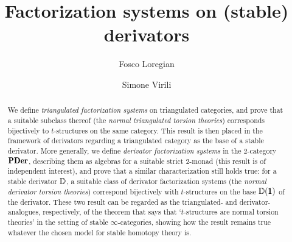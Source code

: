 \documentclass[a4paper,10pt]{amsart}
\title{Factorization systems on (stable) derivators}
\author{Fosco Loregian}
\author[Simone Virili]{Simone Virili}
\begin{document}
\maketitle
\begin{abstract}
We define \emph{triangulated factorization systems} on triangulated categories, and prove that a suitable subclass thereof (the \emph{normal triangulated torsion theories}) corresponds bijectively to $t$-structures on the same category.
This result is then placed in the framework of derivators regarding a triangulated category as the base of a stable derivator. More generally, we define \emph{derivator factorization systems} in the 2-category $\PDer$, describing them as algebras for a suitable strict 2-monad (this result is of independent interest), and prove that a similar characterization still holds true: for a stable derivator $\mathbb{D}$, a suitable class of derivator factorization systems (the \emph{normal derivator torsion theories}) correspond bijectively with $t$-structures on the base $\D(\uno)$ of the derivator.
These two result can be regarded as the triangulated- and derivator- analogues, respectively, of the theorem that says that `$t$-structures are normal torsion theories' in the setting of stable $\infty$-categories, showing how the result remains true whatever the chosen model for stable homotopy theory is.
\end{abstract}



\tableofcontents










\end{document}
